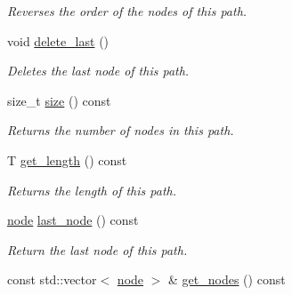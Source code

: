 \begin{DoxyCompactItemize}
\begin{DoxyCompactList}\small\item\em Reverses the order of the nodes of this path. \end{DoxyCompactList}\item 
void \hyperlink{classlgraph_1_1node__path_a6b6f977475b90fda9ea44e6cfc05f40b}{delete\-\_\-last} ()
\begin{DoxyCompactList}\small\item\em Deletes the last node of this path. \end{DoxyCompactList}\item 
size\-\_\-t \hyperlink{classlgraph_1_1node__path_aac9984abc58011efff472c0232f5687d}{size} () const 
\begin{DoxyCompactList}\small\item\em Returns the number of nodes in this path. \end{DoxyCompactList}\item 
T \hyperlink{classlgraph_1_1node__path_a62f986e32efd4a7dd0de63041890f182}{get\-\_\-length} () const 
\begin{DoxyCompactList}\small\item\em Returns the length of this path. \end{DoxyCompactList}\item 
\hypertarget{classlgraph_1_1node__path_af5db1ab614dbc2a12bf7c6f8419ca199}{\hyperlink{namespacelgraph_a397169dd66adf725210a30fb7251773e}{node} \hyperlink{classlgraph_1_1node__path_af5db1ab614dbc2a12bf7c6f8419ca199}{last\-\_\-node} () const }\label{classlgraph_1_1node__path_af5db1ab614dbc2a12bf7c6f8419ca199}

\begin{DoxyCompactList}\small\item\em Return the last node of this path. \end{DoxyCompactList}\item 
\hypertarget{classlgraph_1_1node__path_a9502bc45816df763d5352943a48ab5fa}{const std\-::vector$<$ \hyperlink{namespacelgraph_a397169dd66adf725210a30fb7251773e}{node} $>$ \& \hyperlink{classlgraph_1_1node__path_a9502bc45816df763d5352943a48ab5fa}{get\-\_\-nodes} () const }\label{classlgraph_1_1node__path_a9502bc45816df763d5352943a48ab5fa}


\end{DoxyCompactItemize}
